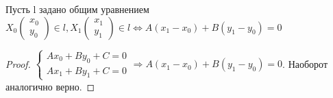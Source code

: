 \begin{proposition}
	Пусть l задано общим уравнением \(X_0\begin{pmatrix}
		x_0 \\ y_0
	\end{pmatrix} \in l, X_1\begin{pmatrix}
		x_1 \\ y_1
	\end{pmatrix} \in l\Longleftrightarrow A(x_1-x_0) + B(y_1-y_0) = 0\)
\end{proposition}
\begin{proof}
	\(\left\{
	\begin{gathered}
		Ax_0 + By_0+C = 0 \\
		Ax_1 + By_1 + C = 0
	\end{gathered}
	\right. \Longrightarrow A(x_1 - x_0) + B(y_1 - y_0 ) = 0\). Наоборот аналогично верно.
\end{proof}

